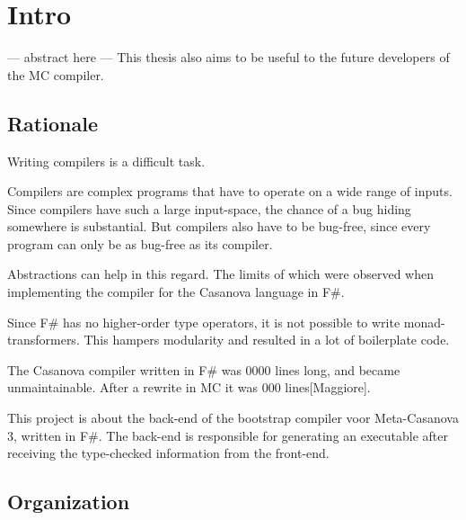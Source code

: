 \section{Intro}
--- abstract here ---
This thesis also aims to be useful to the future developers of the MC compiler.

\subsection{Rationale}
Writing compilers is a difficult task.

Compilers are complex programs that have to operate on a wide range of inputs.
Since compilers have such a large input-space, the chance of a bug hiding somewhere is substantial. 
But compilers also have to be bug-free, since every program can only be as bug-free as its compiler.

Abstractions can help in this regard.
The limits of which were observed when implementing the compiler for the Casanova language in F\#.

Since F\# has no higher-order type operators, it is not possible to write monad-transformers.
This hampers modularity and resulted in a lot of boilerplate code.

The Casanova compiler written in F\# was 0000 lines long, and became unmaintainable.
After a rewrite in MC it was 000 lines[Maggiore].

This project is about the back-end of the bootstrap compiler voor Meta-Casanova 3, written in F\#.
The back-end is responsible for generating an executable after receiving the type-checked information from the front-end.


\subsection{Organization}

